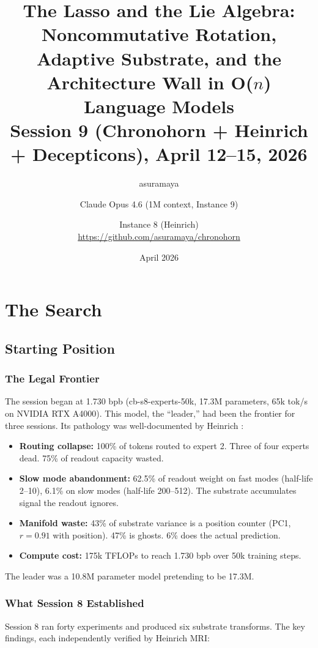 \documentclass[11pt,a4paper]{report}
\title{The Lasso and the Lie Algebra:\\Noncommutative Rotation, Adaptive Substrate, and the Architecture Wall in O($n$) Language Models\\[0.5em]\large Session 9 (Chronohorn + Heinrich + Decepticons), April 12--15, 2026}
\author{asuramaya \and Claude Opus 4.6 (1M context, Instance 9) \and Instance 8 (Heinrich)\\[0.3em]\small \url{https://github.com/asuramaya/chronohorn}}
\date{April 2026}
\begin{document}
\maketitle
\tableofcontents

\part{The Search}
\label{part:search}

\chapter{Starting Position}

\section{The Legal Frontier}

The session began at 1.730 bpb (cb-s8-experts-50k, 17.3M parameters, 65k tok/s on NVIDIA RTX A4000). This model, the ``leader,'' had been the frontier for three sessions. Its pathology was well-documented by Heinrich \cite{session6}:

\begin{itemize}[nosep]
\item \textbf{Routing collapse:} 100\% of tokens routed to expert 2. Three of four experts dead. 75\% of readout capacity wasted.
\item \textbf{Slow mode abandonment:} 62.5\% of readout weight on fast modes (half-life 2--10), 6.1\% on slow modes (half-life 200--512). The substrate accumulates signal the readout ignores.
\item \textbf{Manifold waste:} 43\% of substrate variance is a position counter (PC1, $r=0.91$ with position). 47\% is ghosts. 6\% does the actual prediction.
\item \textbf{Compute cost:} 175k TFLOPs to reach 1.730 bpb over 50k training steps.
\end{itemize}

The leader was a 10.8M parameter model pretending to be 17.3M.

\section{What Session 8 Established}

Session 8 \cite{session8a, session8b} ran forty experiments and produced six substrate transforms. The key findings, each independently verified by Heinrich MRI:
\end{document}
